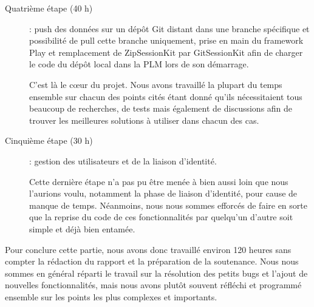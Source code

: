 \begin{description}
\item[Quatrième étape (40 h)] : push des données sur un dépôt Git distant dans une branche spécifique et possibilité de pull cette branche uniquement, prise en main du framework Play et remplacement de ZipSessionKit par GitSessionKit afin de charger le code du dépôt local dans la PLM lors de son démarrage.

C'est là le c\oe ur du projet. Nous avons travaillé la plupart du temps ensemble sur chacun des points cités étant donné qu'ils nécessitaient tous beaucoup de recherches, de tests mais également de discussions afin de trouver les meilleures solutions à utiliser dans chacun des cas.


\item[Cinquième étape (30 h)] : gestion des utilisateurs et de la liaison d'identité.

Cette dernière étape n'a pas pu être menée à bien aussi loin que nous l'aurions voulu, notamment la phase de liaison d'identité, pour cause de manque de temps. Néanmoins, nous nous sommes efforcés de faire en sorte que la reprise du code de ces fonctionnalités par quelqu'un d'autre soit simple et déjà bien entamée.

\end{description}

Pour conclure cette partie, nous avons donc travaillé environ 120 heures sans compter la rédaction du rapport et la préparation de la soutenance. Nous nous sommes en général réparti le travail sur la résolution des petits bugs et l'ajout de nouvelles fonctionnalités, mais nous avons plutôt souvent réfléchi et programmé ensemble sur les points les plus complexes et importants.

